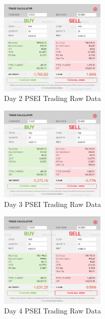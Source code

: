 \begin{figure}[ht]
    \centering
    \includegraphics[width=0.45\textwidth]{./assets/Appendices/B/RawTestsData/PSEI_baseline/day2.png}
    \caption{Day 2 PSEI Trading Raw Data}
    \label{fig:PSEIday2}
\end{figure}
\FloatBarrier

\begin{figure}[ht]
    \centering
    \includegraphics[width=0.45\textwidth]{./assets/Appendices/B/RawTestsData/PSEI_baseline/day3.png}
    \caption{Day 3 PSEI Trading Raw Data}
    \label{fig:PSEIday3}
\end{figure}
\FloatBarrier

\begin{figure}[ht]
    \centering
    \includegraphics[width=0.45\textwidth]{./assets/Appendices/B/RawTestsData/PSEI_baseline/day4.png}
    \caption{Day 4 PSEI Trading Raw Data}
    \label{fig:PSEIday4}
\end{figure}
\FloatBarrier

